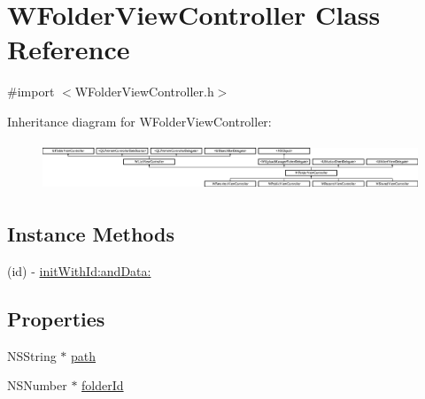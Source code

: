\hypertarget{interface_w_folder_view_controller}{\section{W\-Folder\-View\-Controller Class Reference}
\label{interface_w_folder_view_controller}
}


{\ttfamily \#import $<$W\-Folder\-View\-Controller.\-h$>$}

Inheritance diagram for W\-Folder\-View\-Controller\-:\begin{figure}[H]
\begin{center}
\leavevmode
\includegraphics[height=1.447964cm]{interface_w_folder_view_controller}
\end{center}
\end{figure}
\subsection*{Instance Methods}
\begin{DoxyCompactItemize}
\item 
(id) -\/ \hyperlink{interface_w_folder_view_controller_adde2a6b180f487338755440e69cc8cc8}{init\-With\-Id\-:and\-Data\-:}
\end{DoxyCompactItemize}
\subsection*{Properties}
\begin{DoxyCompactItemize}
\item 
N\-S\-String $\ast$ \hyperlink{interface_w_folder_view_controller_aaeadc12307a838813f5f2cafb636d65c}{path}
\item 
N\-S\-Number $\ast$ \hyperlink{interface_w_folder_view_controller_a2e76ae2c426e91b98b9a4d38f4a00fc8}{folder\-Id}
\end{DoxyCompactItemize}


